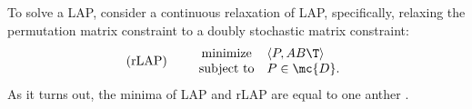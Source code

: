 To solve a LAP, consider a continuous relaxation of LAP, specifically, relaxing the permutation matrix constraint to a doubly stochastic matrix constraint:
\begin{equation}
\text{(rLAP)} \qquad  
\begin{array}{cl}
			\text{minimize}   & \langle P, AB\T \rangle \\
			\text{subject to}  &P \in \mc{D}.   
\end{array}\label{eq:LAP}
\end{equation}
As it turns out, the minima of LAP and rLAP are equal to one anther \cite{Burkard2009}.
